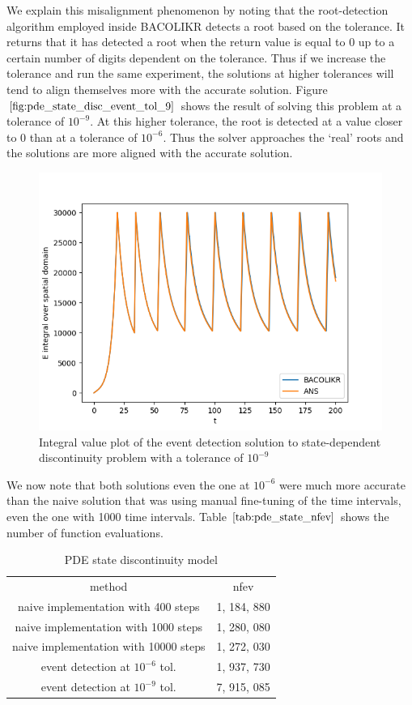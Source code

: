 \documentclass{article}
\begin{document}
We explain this misalignment phenomenon by noting that the root-detection algorithm employed inside BACOLIKR detects a root based on the tolerance. It returns that it has detected a root when the return value is equal to 0 up to a certain number of digits dependent on the tolerance. Thus if we increase the tolerance and run the same experiment, the solutions at higher tolerances will tend to align themselves more with the accurate solution. Figure $\ref{fig:pde_state_disc_event_tol_9}$ shows the result of solving this problem at a tolerance of $10^{-9}$. At this higher tolerance, the root is detected at a value closer to 0 than at a tolerance of $10^{-6}$. Thus the solver approaches the `real' roots and the solutions are more aligned with the accurate solution.


\begin{figure}[H]
\centering
\includegraphics[width=0.7\linewidth]{./figures/pde_state_disc_event_tol_9}
\caption{Integral value plot of the event detection solution to state-dependent discontinuity problem with a tolerance of $10^{-9}$}
\label{fig:pde_state_disc_event_tol_9}
\end{figure}

We now note that both solutions even the one at $10^{-6}$ were much more accurate than the naive solution that was using manual fine-tuning of the time intervals, even the one with 1000 time intervals. Table $\ref{tab:pde_state_nfev}$ shows the number of function evaluations. 

\begin{table}[h]
\caption {PDE state discontinuity model} 
\label{tab:pde_state_nfev}
\begin{center}
\begin{tabular}{ c c } 
method & nfev \\ 
naive implementation with 400 steps & 1, 184, 880 \\
naive implementation with 1000 steps & 1, 280, 080 \\
naive implementation with 10000 steps & 1, 272, 030 \\
event detection at $10^{-6}$ tol. & 1, 937, 730 \\
event detection at $10^{-9}$ tol. & 7, 915, 085 \\
\end{tabular}
\end{center}
\end{table}
\end{document}
